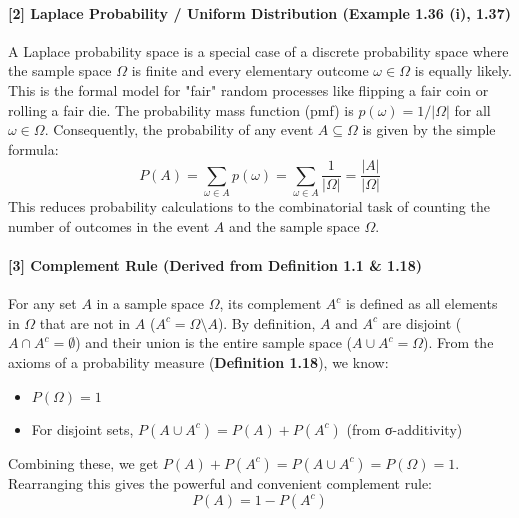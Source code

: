 \documentclass[11pt,a4paper]{article}
\begin{document}
\paragraph{[2] Laplace Probability / Uniform Distribution (Example 1.36 (i), 1.37)}
A Laplace probability space is a special case of a discrete probability space where the sample space $\Omega$ is finite and every elementary outcome $\omega \in \Omega$ is equally likely. This is the formal model for "fair" random processes like flipping a fair coin or rolling a fair die. The probability mass function (pmf) is $p(\omega) = 1/|\Omega|$ for all $\omega \in \Omega$. Consequently, the probability of any event $A \subseteq \Omega$ is given by the simple formula:
\[
P(A) = \sum_{\omega \in A} p(\omega) = \sum_{\omega \in A} \frac{1}{|\Omega|} = \frac{|A|}{|\Omega|}
\]
This reduces probability calculations to the combinatorial task of counting the number of outcomes in the event $A$ and the sample space $\Omega$.

\vspace{1cm}
\hypertarget{note:complement}{\label{note:complement}}
\paragraph{[3] Complement Rule (Derived from Definition 1.1 \& 1.18)}
For any set $A$ in a sample space $\Omega$, its complement $A^c$ is defined as all elements in $\Omega$ that are not in $A$ ($A^c = \Omega \setminus A$). By definition, $A$ and $A^c$ are disjoint ($A \cap A^c = \emptyset$) and their union is the entire sample space ($A \cup A^c = \Omega$).
From the axioms of a probability measure (\textbf{Definition 1.18}), we know:
\begin{itemize}
    \item $P(\Omega) = 1$
    \item For disjoint sets, $P(A \cup A^c) = P(A) + P(A^c)$ (from σ-additivity)
\end{itemize}
Combining these, we get $P(A) + P(A^c) = P(A \cup A^c) = P(\Omega) = 1$. Rearranging this gives the powerful and convenient complement rule:
\[
P(A) = 1 - P(A^c)
\]
\end{document}
